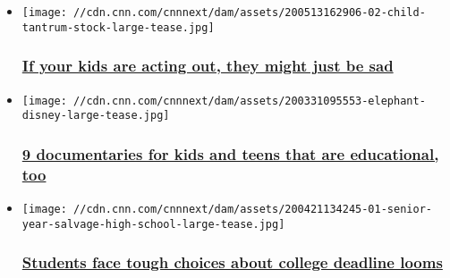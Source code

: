 \begin{itemize}
\item
  \href{/2020/05/18/health/child-acting-out-sadness-coronavirus-wellness/index.html}{}

  \texttt{[image: //cdn.cnn.com/cnnnext/dam/assets/200513162906-02-child-tantrum-stock-large-tease.jpg]}

  \hypertarget{if-your-kids-are-acting-out-they-might-just-be-sad}{%
  \subsubsection{\texorpdfstring{\href{/2020/05/18/health/child-acting-out-sadness-coronavirus-wellness/index.html}{If
  your kids are acting out, they might just be
  sad}}{If your kids are acting out, they might just be sad}}\label{if-your-kids-are-acting-out-they-might-just-be-sad}}
\item
  \href{/2020/04/23/entertainment/documentaries-for-kids-teens-coronavirus-wellness/index.html}{}

  \texttt{[image: //cdn.cnn.com/cnnnext/dam/assets/200331095553-elephant-disney-large-tease.jpg]}

  \hypertarget{9-documentaries-for-kids-and-teens-that-are-educational-too}{%
  \subsubsection{\texorpdfstring{\href{/2020/04/23/entertainment/documentaries-for-kids-teens-coronavirus-wellness/index.html}{9
  documentaries for kids and teens that are educational,
  too}}{9 documentaries for kids and teens that are educational, too}}\label{9-documentaries-for-kids-and-teens-that-are-educational-too}}
\end{itemize}

\begin{itemize}
\item
  \href{/2020/04/24/health/college-decision-deadline-student-wellness/index.html}{}

  \texttt{[image: //cdn.cnn.com/cnnnext/dam/assets/200421134245-01-senior-year-salvage-high-school-large-tease.jpg]}

  \hypertarget{students-face-tough-choices-about-college-deadline-looms-}{%
  \subsubsection{\texorpdfstring{\href{/2020/04/24/health/college-decision-deadline-student-wellness/index.html}{Students
  face tough choices about college deadline looms
  }}{Students face tough choices about college deadline looms }}\label{students-face-tough-choices-about-college-deadline-looms-}}
\end{itemize}

